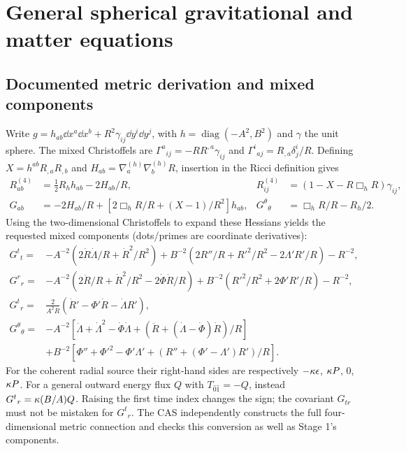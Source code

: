 \section{General spherical gravitational and matter equations}
\subsection{Documented metric derivation and mixed components}
Write $g=h_{ab}\dd x^a\dd x^b+R^2\gamma_{ij}\dd y^i\dd y^j$, with $h=\operatorname{diag}(-A^2,B^2)$ and $\gamma$ the unit sphere. The mixed Christoffels are $\Gamma^a{}_{ij}=-RR^{,a}\gamma_{ij}$ and $\Gamma^i{}_{aj}=R_{,a}\delta^i_j/R$. Defining $X=h^{ab}R_{,a}R_{,b}$ and $H_{ab}=\nabla^{(h)}_a\nabla^{(h)}_bR$, insertion in the Ricci definition gives
\begin{align}
 R^{(4)}_{ab}&=\tfrac12R_hh_{ab}-2H_{ab}/R,&
 R^{(4)}_{ij}&=(1-X-R\Box_hR)\gamma_{ij},\\
 G_{ab}&=-2H_{ab}/R+[2\Box_hR/R+(X-1)/R^2]h_{ab},&
 G^\theta{}_\theta&=\Box_hR/R-R_h/2.
\end{align}
Using the two-dimensional Christoffels to expand these Hessians yields the requested mixed components (dots/primes are coordinate derivatives):
\begin{align}
 G^t{}_t={}&-A^{-2}\left(2\dot R\dot\Lambda/R+\dot R^2/R^2\right)
 +B^{-2}\left(2R''/R+R'^2/R^2-2\Lambda'R'/R\right)-R^{-2},\label{eq:Gtt}\\
 G^r{}_r={}&-A^{-2}\left(2\ddot R/R+\dot R^2/R^2-2\dot\Phi\dot R/R\right)
 +B^{-2}\left(R'^2/R^2+2\Phi'R'/R\right)-R^{-2},\\
 G^t{}_r={}&\frac{2}{A^2R}(\dot R'-\Phi'\dot R-\dot\Lambda R'),\\
 G^\theta{}_\theta={}&-A^{-2}\left[\ddot\Lambda+\dot\Lambda^2-\dot\Phi\dot\Lambda+
 (\ddot R+(\dot\Lambda-\dot\Phi)\dot R)/R\right]\nonumber\\
 &+B^{-2}\left[\Phi''+\Phi'^2-\Phi'\Lambda'+(R''+(\Phi'-\Lambda')R')/R\right].\label{eq:Gangle}
\end{align}
For the coherent radial source their right-hand sides are respectively $-\kappa\epsilon$, $\kappa P$, $0$, $\kappa P$. For a general outward energy flux $Q$ with $T_{\hat0\hat1}=-Q$, instead $G^t{}_r=\kappa(B/A)Q$. Raising the first time index changes the sign; the covariant $G_{tr}$ must not be mistaken for $G^t{}_r$. The CAS independently constructs the full four-dimensional metric connection and checks this conversion as well as Stage 1's components.

